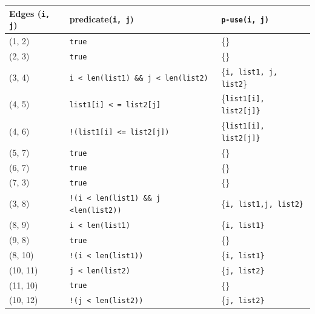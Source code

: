 \documentclass[11pt, oneside]{article}   	%
\begin{document}
\begin{table}[H]
	\begin{tabular}{|l|l|l|}
		\hline
		Edges (\texttt{i, j}) & predicate(\texttt{i, j})                                         & \texttt{p-use(i, j)}                    \\ \hline
		(1, 2)                & \texttt{true}                                                    & \{\}                                    \\ \hline
		(2, 3)                & \texttt{true}                                                    & \{\}                                    \\ \hline
		(3, 4)                & \texttt{i \textless \ len(list1) \&\& j \textless\  len(list2)}  & \{\texttt{i, list1, j, list2}\}         \\ \hline
		(4, 5)                & \texttt{list1{[}i{]} \textless \ {}= list2{[}j{]} }              & \{\texttt{list1{[}i{]}, list2{[}j{]}\}} \\ \hline
		(4, 6)                & \texttt{!(list1{[}i{]} \textless{}= list2{[}j{]})}               & \{\texttt{list1{[}i{]}, list2{[}j{]}\}} \\ \hline
		(5, 7)                & \texttt{true}                                                    & \{\}                                    \\ \hline
		(6, 7)                & \texttt{true}                                                    & \{\}                                    \\ \hline
		(7, 3)                & \texttt{true}                                                    & \{\}                                    \\ \hline
		(3, 8)                & \texttt{!(i \textless \ len(list1) \&\& j \textless len(list2))} & \{\texttt{i, list1,j, list2\}}          \\ \hline
		(8, 9)                & \texttt{i \textless \ len(list1)}                                & \{\texttt{i, list1\}}                   \\ \hline
		(9, 8)                & \texttt{true}                                                    & \{\}                                    \\ \hline
		(8, 10)               & \texttt{!(i \textless \ len(list1))}                             & \{\texttt{i, list1\}}                   \\ \hline
		(10, 11)              & \texttt{j \textless \ len(list2)}                                & \{\texttt{j, list2\}}                   \\ \hline
		(11, 10)              & \texttt{true}                                                    & \{\}                                    \\ \hline
		(10, 12)              & \texttt{!(j \textless \ len(list2))}                             & \{\texttt{j, list2\}}                   \\ \hline
	\end{tabular}
\end{table}
\end{document}
